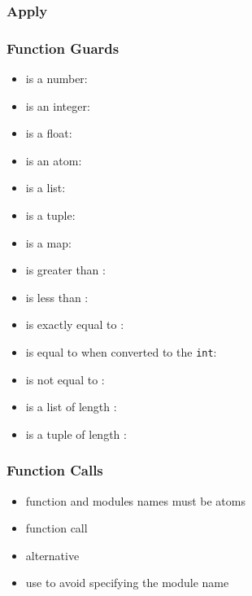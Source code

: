 \documentclass[a4paper,landscape,10pt]{article}
\begin{document}
\begin{multicols*}{2}
  \subsubsection{Apply}

  \missing

  \subsubsection{Function Guards}

  \begin{itemize}
    \item {} is a number: 
    \item {} is an integer: 
    \item {} is a float: 
    \item {} is an atom: 
    \item {} is a list: 
    \item {} is a tuple: 
    \item {} is a map: 
    \item {} is greater than : 
    \item {} is less than : 
    \item {} is exactly equal to : 
    \item {} is equal to  when converted to the \texttt{int}: 
    \item {} is not equal to : 
    \item {} is a list of length : 
    \item {} is a tuple of length : 
  \end{itemize}

  \subsubsection{Function Calls}

  \begin{itemize}
    \item function and modules names must be atoms
    \item function call 
    \item alternative 
    \item use  to avoid specifying the module name
  \end{itemize}


\end{multicols*}
\end{document}
